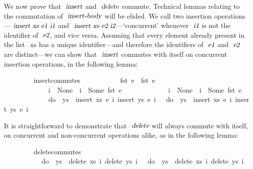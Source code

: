 \documentclass[acmlarge,review,anonymous]{acmart}\settopmatter{printfolios=true}
\begin{document}
We now prove that $\isa{insert}$ and $\isa{delete}$ commute.
Technical lemmas relating to the commutation of $\isa{insert-body}$ will be elided.
We call two insertion operations---$\isa{insert\ xs\ e1\ i1}$ and $\isa{insert\ xs\ e2\ i2}$---`concurrent' whenever $\isa{i1}$ is not the identifier of $\isa{e2}$, and vice versa.
Assuming that every element already present in the list $\isa{xs}$ has a unique identifier---and therefore the identifiers of $\isa{e1}$ and $\isa{e2}$ are distinct---we can show that $\isa{insert}$ commutes with itself on concurrent insertion operations, in the following lemma:
\\
\begin{isabellebody}
\ \ \ \ \ \ \ \  insert{\isacharunderscore}commutes{\isacharcolon}\isanewline
\ \ \ \ \ \ \ \ \ \ \ {\isachardoublequoteopen}fst\ e{}\ {\isasymnoteq}\ fst\ e{}{\isachardoublequoteclose}\isanewline
\ \ \ \ \ \ \ \ \ \ \ \ \ {\isachardoublequoteopen}i{}\ {\isacharequal}\ None\ {\isasymor}\ i{}\ {\isasymnoteq}\ Some\ {\isacharparenleft}fst\ e{}{\isacharparenright}{\isachardoublequoteclose}\isanewline
\ \ \ \ \ \ \ \ \ \ \ \ \ {\isachardoublequoteopen}i{}\ {\isacharequal}\ None\ {\isasymor}\ i{}\ {\isasymnoteq}\ Some\ {\isacharparenleft}fst\ e{}{\isacharparenright}{\isachardoublequoteclose}\isanewline
\ \ \ \ \ \ \ \ \ \ \ \ \ {\isachardoublequoteopen}do\ {\isacharbraceleft}\ ys\ {\isasymleftarrow}\ insert\ xs\ e{}\ i{}{\isacharsemicolon}\ insert\ ys\ e{}\ i{}\ {\isacharbraceright}\ {\isacharequal}\ do\ {\isacharbraceleft}\ ys\ {\isasymleftarrow}\ insert\ xs\ e{}\ i{}{\isacharsemicolon}\ insert\ ys\ e{}\ i{}\ {\isacharbraceright}{\isachardoublequoteclose}
\end{isabellebody}
\vspace{\baselineskip}
It is straightforward to demonstrate that $\isa{delete}$ will always commute with itself, on concurrent and non-concurrent operations alike, as in the following lemma:
\\
\begin{isabellebody}
\ \ \ \ \ \ \ \  delete{\isacharunderscore}commutes{\isacharcolon}\isanewline
\ \ \ \ \ \ \ \ \ \ \ {\isachardoublequoteopen}do\ {\isacharbraceleft}\ ys\ {\isasymleftarrow}\ delete\ xs\ i{}{\isacharsemicolon}\ delete\ ys\ i{}\ {\isacharbraceright}\ {\isacharequal}\ do\ {\isacharbraceleft}\ ys\ {\isasymleftarrow}\ delete\ xs\ i{}{\isacharsemicolon}\ delete\ ys\ i{}\ {\isacharbraceright}{\isachardoublequoteclose}
\end{isabellebody}
\end{document}
